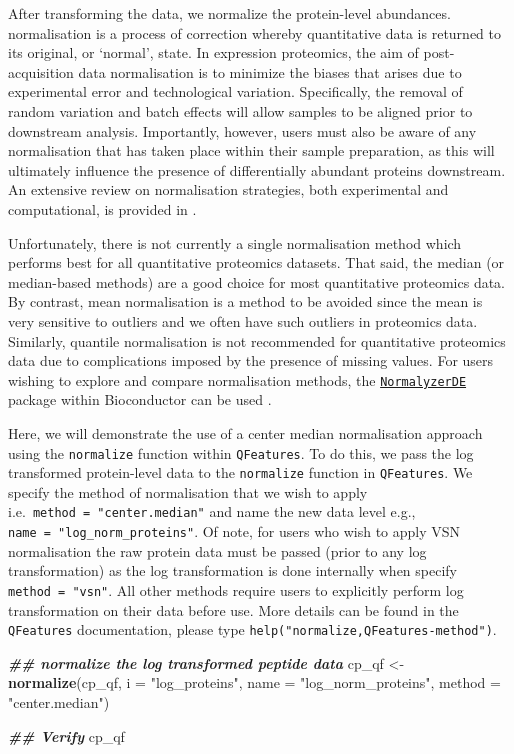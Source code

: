 \documentclass[9pt,a4paper,]{extarticle}
\newenvironment{Shaded}{\begin{snugshade}}{\end{snugshade}}
\newcommand{\AttributeTok}[1]{\textcolor[rgb]{0.13,0.29,0.53}{#1}}
\newcommand{\DocumentationTok}[1]{\textcolor[rgb]{0.56,0.35,0.01}{\textbf{\textit{#1}}}}
\newcommand{\FunctionTok}[1]{\textcolor[rgb]{0.13,0.29,0.53}{\textbf{#1}}}
\newcommand{\NormalTok}[1]{#1}
\newcommand{\OtherTok}[1]{\textcolor[rgb]{0.56,0.35,0.01}{#1}}
\newcommand{\StringTok}[1]{\textcolor[rgb]{0.31,0.60,0.02}{#1}}
\begin{document}
After transforming the data, we normalize the protein-level abundances.
normalisation is a process of correction whereby quantitative data is returned
to its original, or `normal', state. In expression proteomics, the aim of
post-acquisition data normalisation is to minimize the biases that arises due to
experimental error and technological variation. Specifically, the removal of
random variation and batch effects will allow samples to be aligned prior to
downstream analysis. Importantly, however, users must also be aware of any
normalisation that has taken place within their sample preparation, as this will
ultimately influence the presence of differentially abundant proteins
downstream. An extensive review on normalisation strategies, both experimental
and computational, is provided in \citep{ORourke2019}.

Unfortunately, there is not currently a single normalisation method which
performs best for all quantitative proteomics datasets. That said, the median
(or median-based methods) are a good choice for most quantitative proteomics data.
By contrast, mean normalisation is a method to be avoided since the mean is very
sensitive to outliers and we often have such outliers in proteomics data.
Similarly, quantile normalisation is not recommended for quantitative proteomics
data due to complications imposed by the presence of missing values. For users
wishing to explore and compare normalisation methods, the \href{https://www.bioconductor.org/packages/release/bioc/html/NormalyzerDE.html}{\texttt{NormalyzerDE}}
package within Bioconductor can be used \citep{Willforss2018}.

Here, we will demonstrate the use of a center median normalisation approach using
the \texttt{normalize} function within \texttt{QFeatures}. To do this, we pass the log transformed
protein-level data to the \texttt{normalize} function in \texttt{QFeatures}. We specify the
method of normalisation that we wish to apply i.e.~\texttt{method\ =\ "center.median"} and
name the new data level e.g., \texttt{name\ =\ "log\_norm\_proteins"}. Of note, for users who
wish to apply VSN normalisation the raw protein data must be passed (prior to any
log transformation) as the log transformation is done internally when specify
\texttt{method\ =\ "vsn"}. All other methods require users to explicitly perform log
transformation on their data before use. More details can be found in the
\texttt{QFeatures} documentation, please type \texttt{help("normalize,QFeatures-method")}.

\begin{Shaded}
\begin{Highlighting}[]
\DocumentationTok{\#\# normalize the log transformed peptide data}
\NormalTok{cp\_qf }\OtherTok{\textless{}{-}} \FunctionTok{normalize}\NormalTok{(cp\_qf,}
                   \AttributeTok{i =} \StringTok{"log\_proteins"}\NormalTok{,}
                   \AttributeTok{name =} \StringTok{"log\_norm\_proteins"}\NormalTok{,}
                   \AttributeTok{method =} \StringTok{"center.median"}\NormalTok{)}

\DocumentationTok{\#\# Verify}
\NormalTok{cp\_qf}
\end{Highlighting}
\end{Shaded}
\end{document}
